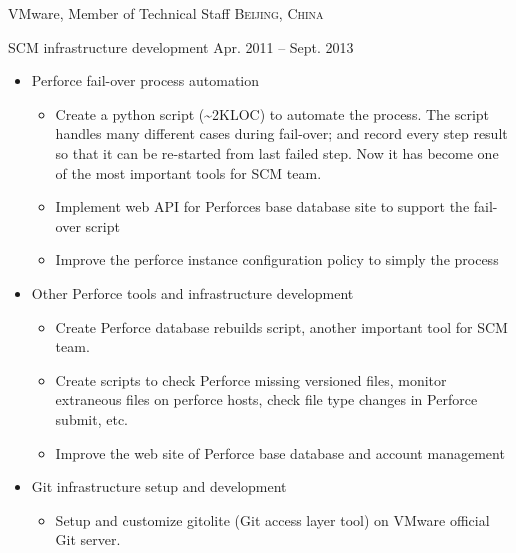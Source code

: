\documentclass[10pt,letterpaper]{article}
\begin{document}
\headedsection
{VMware, Member of Technical Staff}
{\textsc{Beijing, China}}{

\headedsubsection %
{SCM infrastructure development} {Apr. 2011 -- Sept. 2013}
{
    \begin{itemize}
        \item Perforce fail-over process automation
            \begin{itemize}
                \item Create a python script (\~{}2KLOC) to automate the
                    process.  The script handles many different cases during 
                    fail-over; and record every step result so that it can be
                    re-started from last failed step. Now it has become one of
                    the most important tools for SCM team.
                \item Implement web API for Perforces base database site to support the
                    fail-over script
                \item Improve the perforce instance configuration policy to simply the
                    process
            \end{itemize}
        \item Other Perforce tools and infrastructure development
            \begin{itemize}
                \item Create Perforce database rebuilds script, another
                    important tool for SCM team. 
                \item Create scripts to check Perforce missing versioned files,
                    monitor extraneous files on perforce hosts, check file type
                    changes in Perforce submit, etc.
                \item Improve the web site of Perforce base database and account management
            \end{itemize}
        \item Git infrastructure setup and development
            \begin{itemize}
                \item Setup and customize gitolite (Git access layer tool) on
                    VMware official Git server.
                    

\end{itemize}
\end{itemize}}}
\end{document}
